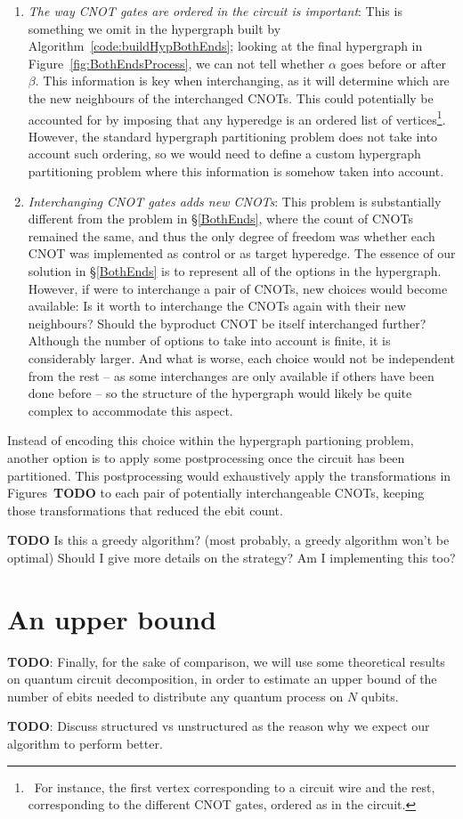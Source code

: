 \begin{enumerate}
  \item \textit{The way CNOT gates are ordered in the circuit is important}: This is something we omit in the hypergraph built by Algorithm~\ref{code:buildHypBothEnds}; looking at the final hypergraph in Figure~\ref{fig:BothEndsProcess}, we can not tell whether \(\alpha\) goes before or after \(\beta\). This information is key when interchanging, as it will determine which are the new neighbours of the interchanged CNOTs. This could potentially be accounted for by imposing that any hyperedge is an ordered list of vertices\footnote{\, For instance, the first vertex corresponding to a circuit wire and the rest, corresponding to the different CNOT gates, ordered as in the circuit.}. However, the standard hypergraph partitioning problem does not take into account such ordering, so we would need to define a custom hypergraph partitioning problem where this information is somehow taken into account.

  \item \textit{Interchanging CNOT gates adds new CNOTs}: This problem is substantially different from the problem in \S\ref{BothEnds}, where the count of CNOTs remained the same, and thus the only degree of freedom was whether each CNOT was implemented as control or as target hyperedge. The essence of our solution in \S\ref{BothEnds} is to represent all of the options in the hypergraph. However, if were to interchange a pair of CNOTs, new choices would become available: Is it worth to interchange the CNOTs again with their new neighbours? Should the byproduct CNOT be itself interchanged further? Although the number of options to take into account is finite, it is considerably larger. And what is worse, each choice would not be independent from the rest -- as some interchanges are only available if others have been done before -- so the structure of the hypergraph would likely be quite complex to accommodate this aspect.
\end{enumerate}

Instead of encoding this choice within the hypergraph partioning problem, another option is to apply some postprocessing once the circuit has been partitioned. This postprocessing would exhaustively apply the transformations in Figures~\textbf{TODO} to each pair of potentially interchangeable CNOTs, keeping those transformations that reduced the ebit count. 

\textbf{TODO} Is this a greedy algorithm? (most probably, a greedy algorithm won't be optimal) Should I give more details on the strategy? Am I implementing this too?

\section{An upper bound}

\textbf{TODO}: Finally, for the sake of comparison, we will use some theoretical results on quantum circuit decomposition, in order to estimate an upper bound of the number of ebits needed to distribute any quantum process on \(N\) qubits.

\textbf{TODO}: Discuss structured vs unstructured as the reason why we expect our algorithm to perform better.
